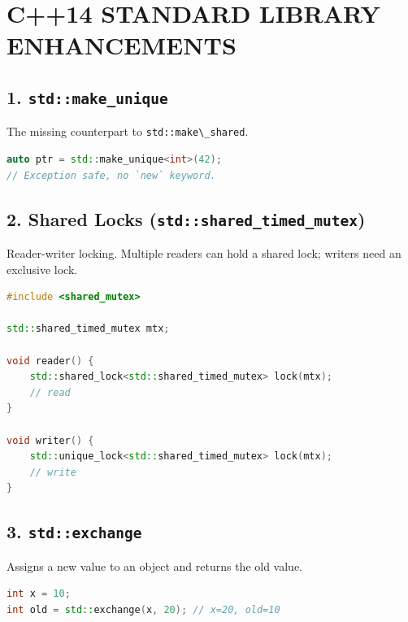 \hypertarget{c14-standard-library-enhancements}{%
\chapter{C++14 STANDARD LIBRARY
ENHANCEMENTS}\label{c14-standard-library-enhancements}}

\hypertarget{stdmake_unique}{%
\section{\texorpdfstring{1.
\texttt{std::make\_unique}}{1. std::make\_unique}}\label{stdmake_unique}}

The missing counterpart to \passthrough{\lstinline!std::make\_shared!}.

\begin{lstlisting}[language={C++}]
auto ptr = std::make_unique<int>(42);
// Exception safe, no `new` keyword.
\end{lstlisting}

\hypertarget{shared-locks-stdshared_timed_mutex}{%
\section{\texorpdfstring{2. Shared Locks
(\texttt{std::shared\_timed\_mutex})}{2. Shared Locks (std::shared\_timed\_mutex)}}\label{shared-locks-stdshared_timed_mutex}}

Reader-writer locking. Multiple readers can hold a shared lock; writers
need an exclusive lock.

\begin{lstlisting}[language={C++}]
#include <shared_mutex>

std::shared_timed_mutex mtx;

void reader() {
    std::shared_lock<std::shared_timed_mutex> lock(mtx);
    // read
}

void writer() {
    std::unique_lock<std::shared_timed_mutex> lock(mtx);
    // write
}
\end{lstlisting}

\hypertarget{stdexchange}{%
\section{\texorpdfstring{3.
\texttt{std::exchange}}{3. std::exchange}}\label{stdexchange}}

Assigns a new value to an object and returns the old value.

\begin{lstlisting}[language={C++}]
int x = 10;
int old = std::exchange(x, 20); // x=20, old=10
\end{lstlisting}

